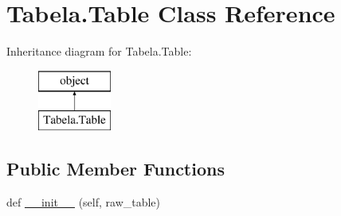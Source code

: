 \hypertarget{class_tabela_1_1_table}{}\section{Tabela.\+Table Class Reference}
\label{class_tabela_1_1_table}
Inheritance diagram for Tabela.\+Table\+:\begin{figure}[H]
\begin{center}
\leavevmode
\includegraphics[height=2.000000cm]{class_tabela_1_1_table}
\end{center}
\end{figure}
\subsection*{Public Member Functions}
\begin{DoxyCompactItemize}
\item 
def \mbox{\hyperlink{class_tabela_1_1_table_a10c29642d83aa4daf8124db325f0a761}{\+\_\+\+\_\+init\+\_\+\+\_\+}} (self, raw\+\_\+table)
\end{DoxyCompactItemize}
